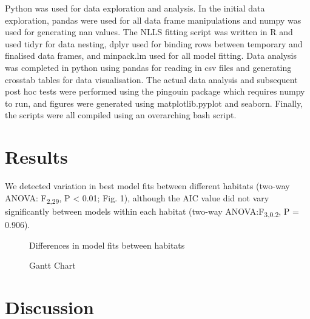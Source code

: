 \documentclass[11pt]{article}
\begin{document}
	Python was used for data exploration and analysis. In the initial data exploration, pandas were used for all data frame manipulations and numpy was used for generating nan values. The NLLS fitting script was written in R and used tidyr for data nesting, dplyr used for binding rows between temporary and finalised data frames, and minpack.lm used for all model fitting. Data analysis was completed in python using pandas for reading in csv files and generating crosstab tables for data visualisation. The actual data analysis and subsequent post hoc tests were performed using the pingouin package which requires numpy to run, and figures were generated using matplotlib.pyplot and seaborn. Finally, the scripts were all compiled using an overarching bash script. 
	
	
	\section*{Results}
	We detected variation in best model fits between different habitats (two-way ANOVA: F\textsubscript{2,29}, P < 0.01; Fig. 1), although the AIC value did not vary significantly between models within each habitat (two-way ANOVA:F\textsubscript{3,0.2}, P = 0.906). 
	\newpage
	
	\begin{figure}[h!]
		
		
		\caption{Differences in model fits between habitats}
		
	\end{figure} 
	
	\newpage
	
	\begin{figure}[h!]
	
	
	\caption{	Gantt Chart}
	\label{MRes Gantt}
	
	\end{figure} 

	\newpage
	\section*{Discussion}
	
	\newpage
	\begin{thebibliography}{1}
	
	\end{thebibliography}
	
\end{document}
